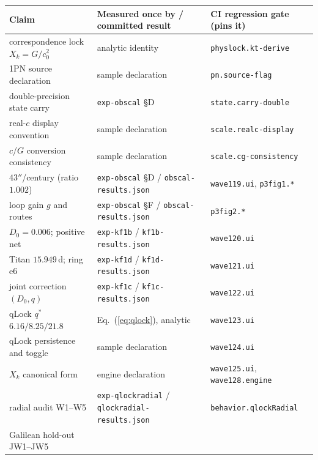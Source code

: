 \documentclass[aps,reprint,amsmath,amssymb,nofootinbib,superscriptaddress,floatfix]{revtex4-2}
\begin{document}
\begin{center}
{\small\setlength{\tabcolsep}{3pt}
\begin{tabularx}{\columnwidth}{@{}YYY@{}}
\toprule
Claim & Measured once by / committed result &
  CI regression gate (pins it) \\
\midrule
correspondence lock $X_k=G/c_0^{2}$ & analytic identity &
  \texttt{physlock.\allowbreak kt-derive} \\
1PN source declaration & sample declaration &
  \texttt{pn.source-flag} \\
double-precision state carry & \texttt{exp-obscal} \S D &
  \texttt{state.\allowbreak carry-double} \\
real-$c$ display convention & sample declaration &
  \texttt{scale.\allowbreak realc-display} \\
$c$/$G$ conversion consistency & sample declaration &
  \texttt{scale.\allowbreak cg-consistency} \\
$43''$/century (ratio $1.002$) &
  \texttt{exp-obscal} \S D / \texttt{obscal-\allowbreak results.json} &
  \texttt{wave119.ui}, \texttt{p3fig1.*} \\
loop gain $g$ and routes &
  \texttt{exp-obscal} \S F / \texttt{obscal-\allowbreak results.json} &
  \texttt{p3fig2.*} \\
$D_0=0.006$; positive net &
  \texttt{exp-kf1b} / \texttt{kf1b-\allowbreak results.json} &
  \texttt{wave120.ui} \\
Titan $15.949$\,d; ring e6 &
  \texttt{exp-kf1d} / \texttt{kf1d-\allowbreak results.json} &
  \texttt{wave121.ui} \\
joint correction $(D_0,q)$ &
  \texttt{exp-kf1c} / \texttt{kf1c-\allowbreak results.json} &
  \texttt{wave122.ui} \\
qLock $q^{*}$ $6.16/8.25/21.8$ & Eq.~(\ref{eq:qlock}), analytic &
  \texttt{wave123.ui} \\
qLock persistence and toggle & sample declaration &
  \texttt{wave124.ui} \\
$X_k$ canonical form & engine declaration &
  \texttt{wave125.ui}, \texttt{wave128.\allowbreak engine} \\
radial audit W1--W5 &
  \texttt{exp-\allowbreak qlockradial} /
  \texttt{qlockradial-\allowbreak results.json} &
  \texttt{behavior.\allowbreak qlockRadial} \\
Galilean hold-out JW1--JW5 &

\end{tabularx}}
\end{center}
\end{document}
